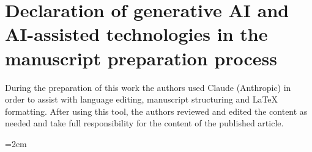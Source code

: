 \documentclass[preprint,12pt]{elsarticle}
\begin{document}
\section*{Declaration of generative AI and AI-assisted technologies in the
manuscript preparation process}
During the preparation of this work the authors used Claude (Anthropic) in
order to assist with language editing, manuscript structuring and \LaTeX{}
formatting. After using this tool, the authors reviewed and edited the
content as needed and take full responsibility for the content of the
published article.

\begingroup
\emergencystretch=2em


\endgroup
\end{document}
